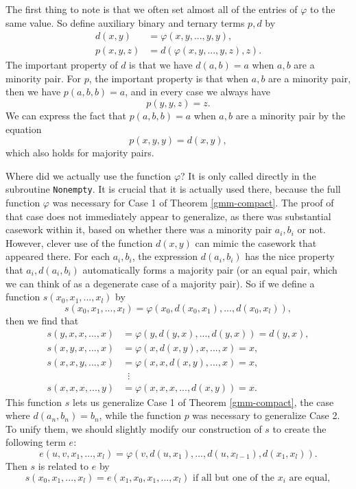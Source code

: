 The first thing to note is that we often set almost all of the entries of $\varphi$ to the same value. So define auxiliary binary and ternary terms $p,d$ by
\begin{align*}
d(x,y) &= \varphi(x,y,...,y,y),\\
p(x,y,z) &= d(\varphi(x,y,...,y,z),z).
\end{align*}
The important property of $d$ is that we have $d(a,b) = a$ when $a,b$ are a minority pair. For $p$, the important property is that when $a,b$ are a minority pair, then we have $p(a,b,b) = a$, and in every case we always have
\[
p(y,y,z) = z.
\]
We can express the fact that $p(a,b,b) = a$ when $a,b$ are a minority pair by the equation
\[
p(x,y,y) = d(x,y),
\]
which also holds for majority pairs.

Where did we actually use the function $\varphi$? It is only called directly in the subroutine \texttt{Nonempty}. It is crucial that it is actually used there, because the full function $\varphi$ was necessary for Case 1 of Theorem \ref{gmm-compact}. The proof of that case does not immediately appear to generalize, as there was substantial casework within it, based on whether there was a minority pair $a_i,b_i$ or not. However, clever use of the function $d(x,y)$ can mimic the casework that appeared there. For each $a_i, b_i$, the expression $d(a_i,b_i)$ has the nice property that $a_i, d(a_i,b_i)$ automatically forms a majority pair (or an equal pair, which we can think of as a degenerate case of a majority pair). So if we define a function $s(x_0,x_1, ..., x_l)$ by
\[
s(x_0, x_1,..., x_l) = \varphi(x_0,d(x_0,x_1), ..., d(x_0,x_l)),
\]
then we find that
\begin{align*}
s(y,x,x,...,x) &= \varphi(y,d(y,x), ..., d(y,x)) = d(y,x),\\
s(x,y,x,...,x) &= \varphi(x, d(x,y), x, ..., x) = x,\\
s(x,x,y,...,x) &= \varphi(x, x, d(x,y), ..., x) = x,\\
&\;\; \vdots\\
s(x,x,x,...,y) &= \varphi(x, x, x, ..., d(x,y)) = x.
\end{align*}
This function $s$ lets us generalize Case 1 of Theorem \ref{gmm-compact}, the case where $d(a_n,b_n) = b_n$, while the function $p$ was necessary to generalize Case 2. To unify them, we should slightly modify our construction of $s$ to create the following term $e$:
\[
e(u,v,x_1, ..., x_l) = \varphi(v, d(u,x_1), ..., d(u,x_{l-1}),d(x_1,x_l)).
\]
Then $s$ is related to $e$ by
\[
s(x_0, x_1, ..., x_l) = e(x_1,x_0,x_1,...,x_l)\text{ if all but one of the }x_i\text{ are equal},
\]
